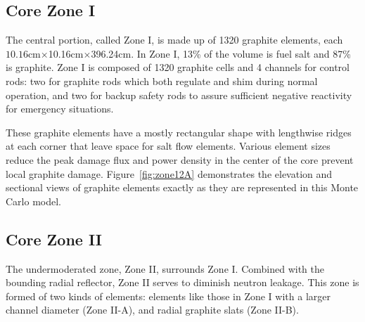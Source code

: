 \documentclass{anstrans}
\begin{document}
\subsection{Core Zone I}

The central portion, called Zone I, is made up of 1320 graphite elements, each 
$10.16$cm$\times$10.16cm$\times$396.24cm.
In Zone I, 13\% of the volume is fuel salt and 87\% is graphite. Zone I is 
composed of 1320 graphite cells and 4 channels for control rods: two for 
graphite rods which both regulate and shim during normal operation, and two
for backup safety rods to assure sufficient negative reactivity for emergency 
situations.

These graphite elements have a mostly rectangular shape with lengthwise ridges 
at each corner that leave space for salt flow elements. Various element sizes 
reduce the peak damage flux and power density in the center of the core prevent 
local graphite damage. Figure~\ref{fig:zone12A} demonstrates the elevation and 
sectional views of graphite elements exactly as they are represented in this 
Monte Carlo model.

\subsection{Core Zone II}
The undermoderated zone, Zone II, surrounds Zone I.
Combined with the bounding radial reflector, Zone II serves to diminish neutron 
leakage. This zone is formed of two kinds of elements: elements like those in 
Zone I with a larger channel diameter (Zone II-A), and radial
graphite slats (Zone II-B). 
\end{document}
